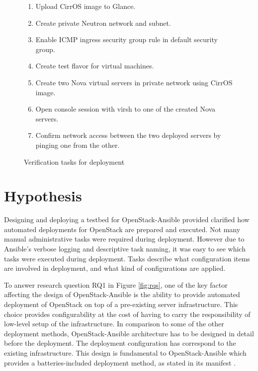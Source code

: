 \begin{figure}[t]
\centering
\begin{enumerate}
  \itemsep0em
  \item Upload CirrOS image to Glance.
  \item Create private Neutron network and subnet.
  \item Enable ICMP ingress security group rule in default security group.
  \item Create test flavor for virtual machines.
  \item Create two Nova virtual servers in private network using CirrOS image.
  \item Open console session with virsh to one of the created Nova servers.
  \item Confirm network access between the two deployed servers by pinging one
        from the other.
\end{enumerate}
\caption{Verification tasks for deployment}
\label{fig:verify-tasks}
\end{figure}

\section{Hypothesis}

Designing and deploying a testbed for OpenStack-Ansible provided clarified how
automated deployments for OpenStack are prepared and executed. Not many manual
administrative tasks were required during deployment. However due to Ansible's
verbose logging and descriptive task naming, it was easy to see which tasks
were executed during deployment. Tasks describe what configuration items are
involved in deployment, and what kind of configurations are applied.

To answer research question RQ1 in Figure \ref{fig:rqs}, one of the key factor
affecting the design of OpenStack-Ansible is the ability to provide automated
deployment of OpenStack on top of a pre-existing server infrastructure. This
choice provides configurability at the cost of having to carry the
responsibility of low-level setup of the infrastructure. In comparison to some
of the other deployment methods, OpenStack-Ansible architecture has to be
designed in detail before the deployment. The deployment configuration has
correspond to the existing infrastructure. This design is fundamental to
OpenStack-Ansible which provides a batteries-included deployment method, as
stated in its manifest \cite{openstack-ansible}.

